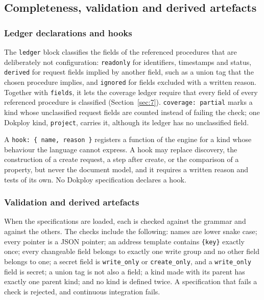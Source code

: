 \subsection{Completeness, validation and derived artefacts}\label{sec:5.4}

\subsubsection*{Ledger declarations and hooks}

The \texttt{ledger} block classifies the fields of the referenced procedures that are deliberately not
configuration: \texttt{readonly} for identifiers, timestamps and status, \texttt{derived} for request fields
implied by another field, such as a union tag that the chosen procedure implies, and \texttt{ignored} for
fields excluded with a written reason. Together with \texttt{fields}, it lets the coverage ledger require
that every field of every referenced procedure is classified (Section~\ref{sec:7}). \texttt{coverage:\ partial} marks a
kind whose unclassified request fields are counted instead of failing the check; one Dokploy kind,
\texttt{project}, carries it, although its ledger has no unclassified field.

A \texttt{hook:\ \{\ name,\ reason\ \}} registers a function of the engine for a kind whose behaviour the language
cannot express. A hook may replace discovery, the construction of a create request, a step after
create, or the comparison of a property, but never the document model, and it requires a written
reason and tests of its own. No Dokploy specification declares a hook.

\subsubsection*{Validation and derived artefacts}

When the specifications are loaded, each is checked against the grammar and against the others. The
checks include the following: names are lower snake case; every pointer is a JSON pointer; an
address template contains \texttt{\{key\}} exactly once; every changeable field belongs to exactly one write
group and no other field belongs to one; a secret field is \texttt{write\_only} or \texttt{create\_only}, and a
\texttt{write\_only} field is secret; a union tag is not also a field; a kind made with its parent has
exactly one parent kind; and no kind is defined twice. A specification that fails a check is rejected,
and continuous integration fails.

